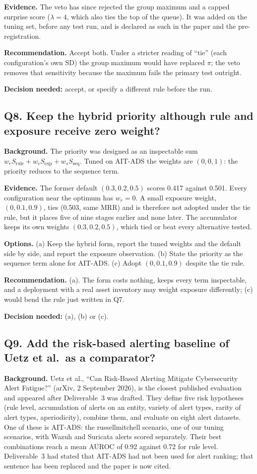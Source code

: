 \documentclass[10.5pt,a4paper]{article}
\newcommand{\rec}[1]{\par\smallskip\noindent\colorbox{gray!12}{\parbox{\dimexpr\linewidth-2\fboxsep}{\textbf{Recommendation.} #1}}\par\smallskip}
\newcommand{\ask}[1]{\par\noindent\textbf{Decision needed:} #1\par\medskip}
\newcommand{\sub}[1]{\par\smallskip\noindent\textbf{#1}\quad}
\begin{document}
\sub{Evidence.} The veto has since rejected the group maximum and a capped surprise score ($\lambda = 4$, which also ties the top of the queue). It was added on the tuning set, before any test run, and is declared as such in the paper and the pre-registration.

\rec{Accept both. Under a stricter reading of ``tie'' (each configuration's own SD) the group maximum would have replaced $\pi$; the veto removes that sensitivity because the maximum fails the primary test outright.}
\ask{accept, or specify a different rule before the run.}

\subsection*{Q8. Keep the hybrid priority although rule and exposure receive zero weight?}

\sub{Background.} The priority was designed as an inspectable sum $w_r S_\mathrm{rule} + w_c S_\mathrm{exp} + w_s S_\mathrm{seq}$. Tuned on AIT-ADS the weights are $(0, 0, 1)$: the priority reduces to the sequence term.

\sub{Evidence.} The former default $(0.3, 0.2, 0.5)$ scores 0.417 against 0.501. Every configuration near the optimum has $w_r = 0$. A small exposure weight, $(0, 0.1, 0.9)$, ties (0.503, same MRR) and is therefore not adopted under the tie rule, but it places five of nine stages earlier and none later. The accumulator keeps its own weights $(0.3, 0.2, 0.5)$, which tied or beat every alternative tested.

\sub{Options.} (a) Keep the hybrid form, report the tuned weights and the default side by side, and report the exposure observation. (b) State the priority as the sequence term alone for AIT-ADS. (c) Adopt $(0, 0.1, 0.9)$ despite the tie rule.

\rec{(a). The form costs nothing, keeps every term inspectable, and a deployment with a real asset inventory may weight exposure differently; (c) would bend the rule just written in Q7.}
\ask{(a), (b) or (c).}


\subsection*{Q9. Add the risk-based alerting baseline of Uetz et al.\ as a comparator?}

\sub{Background.} Uetz et al., ``Can Risk-Based Alerting Mitigate Cybersecurity Alert Fatigue?'' (arXiv, 2 September 2026), is the closest published evaluation and appeared after Deliverable~3 was drafted. They define five risk hypotheses (rule level, accumulation of alerts on an entity, variety of alert types, rarity of alert types, aperiodicity), combine them, and evaluate on eight alert datasets. One of these is AIT-ADS: the russellmitchell scenario, one of our tuning scenarios, with Wazuh and Suricata alerts scored separately. Their best combinations reach a mean AUROC of 0.92 against 0.72 for rule level. Deliverable~3 had stated that AIT-ADS had not been used for alert ranking; that sentence has been replaced and the paper is now cited.
\end{document}
